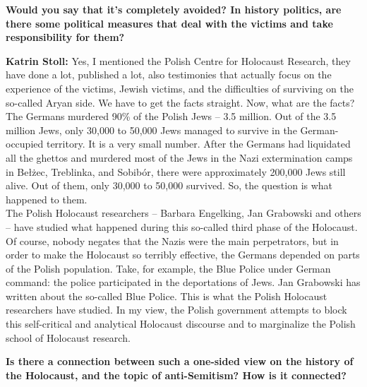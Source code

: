 \textbf{Would you say that it’s completely avoided? In history politics, are there some political measures that deal with the victims and take responsibility for them?} 

\textbf{Katrin Stoll:} Yes, I mentioned the Polish Centre for Holocaust Research, they have done a lot, published a lot, also testimonies that actually focus on the experience of the victims, Jewish victims, and the difficulties of surviving on the so-called Aryan side. We have to get the facts straight. Now, what are the facts? The Germans murdered 90\% of the Polish Jews – 3.5 million. Out of the 3.5 million Jews, only 30,000 to 50,000 Jews managed to survive in the German-occupied territory. It is a very small number. After the Germans had liquidated all the ghettos and murdered most of the Jews in the Nazi extermination camps in Bełżec, Treblinka, and Sobibór, there were approximately 200,000 Jews still alive. Out of them, only 30,000 to 50,000 survived. So, the question is what happened to them.\\ 
The Polish Holocaust researchers – Barbara Engelking, Jan Grabowski and others – have studied what happened during this so-called third phase of the Holocaust. Of course, nobody negates that the Nazis were the main perpetrators, but in order to make the Holocaust so terribly effective, the Germans depended on parts of the Polish population. Take, for example, the Blue Police under German command: the police participated in the deportations of Jews. Jan Grabowski has written about the so-called Blue Police. This is what the Polish Holocaust researchers have studied. In my view, the Polish government attempts to block this self-critical and analytical Holocaust discourse and to marginalize the Polish school of Holocaust research.  

\textbf{Is there a connection between such a one-sided view on the history of the Holocaust, and the topic of anti-Semitism? How is it connected?} 

